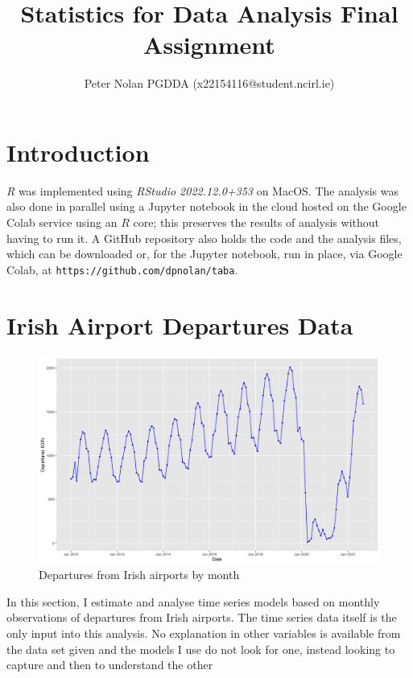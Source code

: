 \documentclass[9pt,technote]{IEEEtran}
\begin{document}
\title{Statistics for Data Analysis Final Assignment}
\author{Peter Nolan PGDDA (x22154116@student.ncirl.ie)}

\section{Introduction}

\textit{R} was implemented using \textit{RStudio 2022.12.0+353} on MacOS.  The analysis was also done in parallel using a Jupyter notebook in the cloud hosted on the Google Colab service using an $R$ core; this preserves the results of analysis without having to run it.  A GitHub repository also holds the code and the analysis files, which can be downloaded or, for the Jupyter notebook, run in place, via Google Colab, at \texttt{https://github.com/dpnolan/taba}.  

\section{Irish Airport Departures Data}

\begin{figure}
    \centering
    \includegraphics[width=1\textwidth]{ts_departs.png}
    \caption{Departures from Irish airports by month}
    \label{fig:ts_departs}
\end{figure}

In this section, I estimate and analyse time series models based on monthly observations of departures from Irish airports.  The time series data itself is the only input into this analysis.  No explanation in other variables is available from the data set given and the models I use do not look for one, instead looking to capture and then to understand the other
\end{document}
